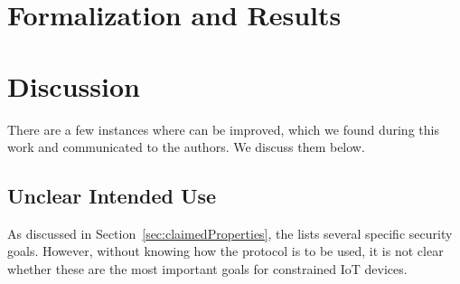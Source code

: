 \documentclass[runningheads, envcountsame, hidelinks, a4paper, draft, x11names]{llncs}
\begin{document}
\section{Formalization and Results}
\label{sec:formalization}


\section{Discussion}
\label{sec:discussion}
There are a few instances where \mEdhoc{} can be improved,
which we found during this work and communicated to the authors. We discuss them below.
%

%

\subsection{Unclear Intended Use}
\label{sec:unclearProtocolUse}
%
As discussed in Section~\ref{sec:claimedProperties}, the \mSpec{} lists
several specific security goals.
%
However, without knowing how the protocol is to be used,
it is not clear whether these are the most important goals for constrained IoT
devices.
%
\end{document}
